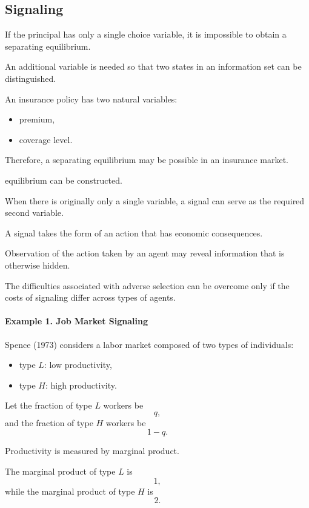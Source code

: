 \subsection{Signaling}

If the principal has only a single choice variable, it is impossible to obtain a separating equilibrium.

An additional variable is needed so that two states in an information set can be distinguished.

An insurance policy has two natural variables:

\begin{itemize}
    \item premium,
    \item coverage level.
\end{itemize}

Therefore, a separating equilibrium may be possible in an insurance market.



equilibrium can be constructed.

When there is originally only a single variable, a signal can serve as the required second variable.

A signal takes the form of an action that has economic consequences.

Observation of the action taken by an agent may reveal information that is otherwise hidden.

The difficulties associated with adverse selection can be overcome only if the costs of signaling differ across types of agents.

\paragraph{Example 1. Job Market Signaling}

Spence (1973) considers a labor market composed of two types of individuals:

\begin{itemize}
    \item type \(L\): low productivity,
    \item type \(H\): high productivity.
\end{itemize}

Let the fraction of type \(L\) workers be
\[
q,
\]
and the fraction of type \(H\) workers be
\[
1-q.
\]

Productivity is measured by marginal product.

The marginal product of type \(L\) is
\[
1,
\]
while the marginal product of type \(H\) is
\[
2.
\]

